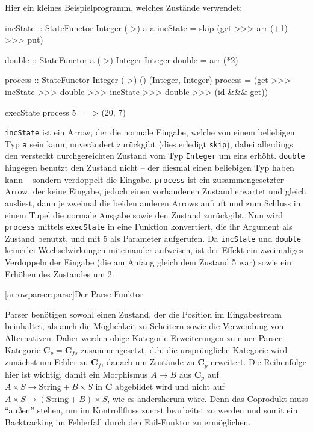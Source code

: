 \documentclass[12pt, a4paper, bibgerm]{scrbook}
\newcommand\icode[1]{\lstinline?#1?}
\newcommand\lsection{}
\newcommand\ato{\rightarrow} %
\begin{document}
Hier ein kleines Beispielprogramm, welches Zustände verwendet:
\begin{code}
incState :: StateFunctor Integer (->) a a
incState = skip (get >>> arr (+1) >>> put)

double :: StateFunctor a (->) Integer Integer
double = arr (*2)

process :: StateFunctor Integer (->) () (Integer, Integer)
process = (get          >>>
           incState     >>> 
           double       >>> 
           incState     >>> 
           double       >>> 
           (id &&& get))

execState process 5     ==> (20, 7)
\end{code}
\icode{incState} ist ein Arrow, der die normale Eingabe, welche von
einem beliebigen Typ \icode{a} sein kann, unverändert zurückgibt (dies
erledigt \icode{skip}), dabei allerdings den versteckt durchgereichten
Zustand vom Typ \icode{Integer} um eins erhöht. \icode{double} hingegen
benutzt den Zustand nicht -- der diesmal einen beliebigen Typ haben kann
-- sondern verdoppelt die Eingabe. \icode{process} ist ein
zusammengesetzter Arrow, der keine Eingabe, jedoch einen vorhandenen
Zustand erwartet und gleich ausliest, dann je zweimal die beiden
anderen Arrows aufruft und zum Schluss in einem Tupel die normale
Ausgabe sowie den Zustand zurückgibt. Nun wird \icode{process} mittels
\icode{execState} in eine Funktion konvertiert, die ihr Argument als
Zustand benutzt, und mit 5 als Parameter aufgerufen. Da \icode{incState}
und \icode{double} keinerlei Wechselwirkungen miteinander aufweisen, ist
der Effekt ein zweimaliges Verdoppeln der Eingabe (die am Anfang gleich
dem Zustand 5 war) sowie ein Erhöhen des Zustandes um 2.

\lsection[arrowparser:parse]{Der Parse-Funktor}

Parser benötigen sowohl einen Zustand, der die Position im Eingabestream
beinhaltet, als auch die Möglichkeit zu Scheitern sowie die Verwendung
von Alternativen. Daher werden obige Kategorie-Erweiterungen zu einer
Parser-Kategorie $\mathbf{C}_p = \mathbf{C}_{fs}$ zusammengesetzt,
d.h. die ursprüngliche Kategorie wird zunächst um Fehler zu
$\mathbf{C}_f$, danach um Zustände zu $\mathbf{C}_p$ erweitert. Die
Reihenfolge hier ist wichtig, damit ein Morphismus $A \ato B$ aus
$\mathbf{C}_p$ auf $A \times S \ato \mathrm{String} + B \times S$ in
$\mathbf{C}$ abgebildet wird und nicht auf $A \times S \ato
(\mathrm{String} + B) \times S$, wie es andersherum wäre. Denn das
Coprodukt muss "`außen"' stehen, um im Kontrollfluss zuerst bearbeitet
zu werden und somit ein Backtracking im Fehlerfall durch den
Fail-Funktor zu ermöglichen.
\end{document}
